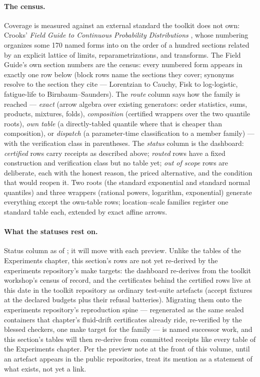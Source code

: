 \paragraph{The census.} Coverage is measured against an external
standard the toolkit does not own: Crooks' \emph{Field Guide to
Continuous Probability Distributions}
, whose
numbering organizes some 170 named forms into on the order of a hundred
sections related by an explicit lattice of limits, reparametrizations,
and transforms. The Field Guide's own section numbers are the census:
every numbered form appears in exactly one row below (block rows name
the sections they cover; synonyms resolve to the section they cite ---
Lorentzian to Cauchy, Fisk to log-logistic, fatigue-life to
Birnbaum--Saunders). The \emph{route} column says how the family is
reached --- \emph{exact} (arrow algebra over existing generators: order
statistics, sums, products, mixtures, folds), \emph{composition}
(certified wrappers over the two quantile roots), \emph{own table} (a
directly-tabled quantile where that is cheaper than composition), or
\emph{dispatch} (a parameter-time classification to a member family) ---
with the verification class in parentheses. The \emph{status} column is
the dashboard: \emph{certified} rows carry receipts as described above;
\emph{routed} rows have a fixed construction and verification class but
no table yet; \emph{out of scope} rows are deliberate, each with the
honest reason, the priced alternative, and the condition that would
reopen it. Two roots (the standard exponential and standard normal
quantiles) and three wrappers (rational powers, logarithm, exponential)
generate everything except the own-table rows; location--scale families
register one standard table each, extended by exact affine arrows.

\medskip


\paragraph{What the statuses rest on.} Status column as of \distdashcensusdate; it will move with each preview. Unlike the tables of the
Experiments chapter, this section's rows are not yet re-derived by the
experiments repository's make targets: the dashboard re-derives from
the toolkit workshop's census of record, and the certificates behind
the certified rows live at this date in the toolkit repository as
ordinary test-suite artefacts (accept fixtures at the declared budgets
plus their refusal batteries). Migrating them onto the experiments
repository's reproduction spine --- regenerated as the same sealed
containers that chapter's fluid-drift certificates already ride,
re-verified by the blessed checkers, one make target for the family ---
is named successor work, and this section's tables will then re-derive
from committed receipts like every table of the Experiments chapter.
Per the preview note at the front of this volume, until an artefact
appears in the public repositories, treat its mention as a statement of
what exists, not yet a link.
